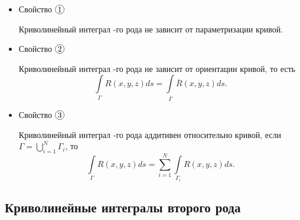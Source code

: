 \begin{itemize}
    \item Свойство $ \circled{1} $
          \begin{statement}
              Криволинейный интеграл -го рода не зависит от параметризации кривой.
          \end{statement}

    \item Свойство $ \circled{2} $
          \begin{statement}
              Криволинейный интеграл -го рода не зависит от ориентации кривой, то есть
              \[
                  \int\limits_\Gamma R(x,y,z)ds = \int\limits_{\overline{\Gamma}}\overline{R}(x,y,z)ds.
              \]
          \end{statement}

    \item Свойство $ \circled{3} $
          \begin{statement}
              Криволинейный интеграл -го рода аддитивен относительно кривой, если $ \Gamma = \bigcup\limits_{i=1}^N \Gamma_i $, то
              \[
                  \int\limits_\Gamma R(x,y,z)ds = \sum_{i=1}^{N}\int\limits_{\Gamma_i}R(x,y,z)ds.
              \]
          \end{statement}
\end{itemize}

\subsection{Криволинейные интегралы второго рода}

